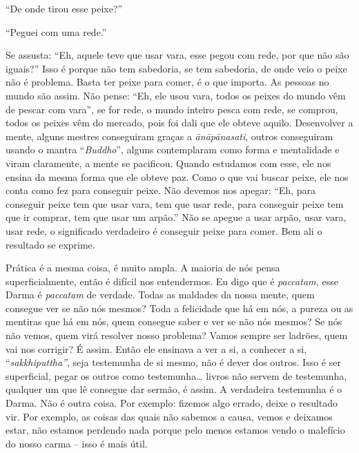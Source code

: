 “De onde tirou esse peixe?” 

“Peguei com uma rede.” 

Se assusta: “Eh, aquele teve que usar vara, esse pegou com rede, por
que não são iguais?” Isso é porque não tem sabedoria, se tem sabedoria,
de onde veio o peixe não é problema. Basta ter peixe para comer, é o
que importa. As pessoas no mundo são assim. Não pense: “Eh, ele usou
vara, todos os peixes do mundo vêm de pescar com vara”, se for rede, o
mundo inteiro pesca com rede, se comprou, todos os peixes vêm do
mercado, pois foi dali que ele obteve aquilo. Desenvolver a mente,
alguns mestres conseguiram graças a \textit{\=an\=ap\=anasati}, outros
conseguiram usando o mantra “\textit{Buddho}”, alguns contemplaram como
forma e mentalidade e viram claramente, a mente se pacificou. Quando
estudamos com esse, ele nos ensina da mesma forma que ele obteve paz.
Como o que vai buscar peixe, ele nos conta como fez para conseguir
peixe. Não devemos nos apegar: “Eh, para conseguir peixe tem que usar
vara, tem que usar rede, para conseguir peixe tem que ir comprar, tem
que usar um arpão.” Não se apegue a usar arpão, usar vara, usar rede, o
significado verdadeiro é conseguir peixe para comer. Bem ali o
resultado se exprime. 

Prática é a mesma coisa, é muito ampla. A maioria de nós pensa
superficialmente, então é difícil nos entendermos. Eu digo que é
\textit{paccatam,} esse Darma é \textit{paccatam} de verdade. Todas as
maldades da nossa mente, quem consegue ver se não nós mesmos? Toda a
felicidade que há em nós, a pureza ou as mentiras que há em nós, quem
consegue saber e ver se não nós mesmos? Se nós não vemos, quem virá
resolver nosso problema? Vamos sempre ser ladrões, quem vai nos
corrigir? É assim. Então ele ensinava a ver a si, a conhecer a si,
“\textit{sakkhiputtha”}, seja testemunha de si mesmo, não é dever dos
outros. Isso é ser superficial, pegar os outros como testemunha… livros
não servem de testemunha, qualquer um que lê consegue dar sermão, é
assim. A verdadeira testemunha é o Darma. Não é outra coisa. Por
exemplo: fizemos algo errado, deixe o resultado vir. Por exemplo, as
coisas das quais não sabemos a causa, vemos e deixamos estar, não
estamos perdendo nada porque pelo menos estamos vendo o malefício do
nosso carma – isso é mais útil. 

